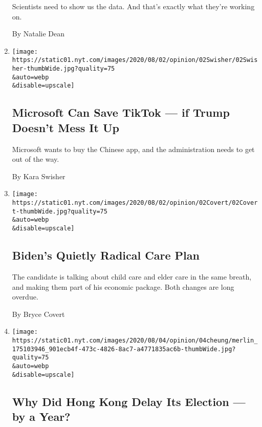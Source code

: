 \begin{enumerate}
  Scientists need to show us the data. And that's exactly what they're
  working on.

  By Natalie Dean
\item
  \href{/2020/08/02/opinion/02tik-tok-china-trump.html}{}

  \texttt{[image: https://static01.nyt.com/images/2020/08/02/opinion/02Swisher/02Swisher-thumbWide.jpg?quality=75\\\&auto=webp\\\&disable=upscale]}

  \hypertarget{microsoft-can-save-tiktok--if-trump-doesnt-mess-it-up}{%
  \subsection{Microsoft Can Save TikTok --- if Trump Doesn't Mess It
  Up}\label{microsoft-can-save-tiktok--if-trump-doesnt-mess-it-up}}

  Microsoft wants to buy the Chinese app, and the administration needs
  to get out of the way.

  By Kara Swisher
\item
  \href{/2020/08/02/opinion/biden-child-care.html}{}

  \texttt{[image: https://static01.nyt.com/images/2020/08/02/opinion/02Covert/02Covert-thumbWide.jpg?quality=75\\\&auto=webp\\\&disable=upscale]}

  \hypertarget{bidens-quietly-radical-care-plan}{%
  \subsection{Biden's Quietly Radical Care
  Plan}\label{bidens-quietly-radical-care-plan}}

  The candidate is talking about child care and elder care in the same
  breath, and making them part of his economic package. Both changes are
  long overdue.

  By Bryce Covert
\item
  \href{/2020/08/02/opinion/hong-kong-election-china.html}{}

  \texttt{[image: https://static01.nyt.com/images/2020/08/04/opinion/04cheung/merlin\_175103946\_901ecb4f-473c-4826-8ac7-a4771835ac6b-thumbWide.jpg?quality=75\\\&auto=webp\\\&disable=upscale]}

  \hypertarget{why-did-hong-kong-delay-its-election--by-a-year}{%
  \subsection{Why Did Hong Kong Delay Its Election --- by a
  Year?}\label{why-did-hong-kong-delay-its-election--by-a-year}}


\end{enumerate}
